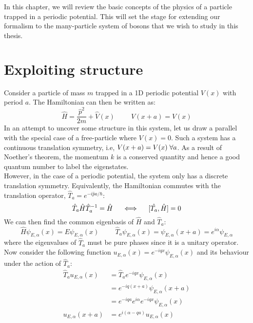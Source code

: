 
In this chapter, we will review the basic concepts of the physics of a particle trapped in a periodic potential. This will set the stage for extending our formalism to the many-particle system of bosons that we wish to study in this thesis. 

\section{Exploiting structure}
Consider a particle of mass $m$ trapped in a 1D periodic potential $V(x)$ with period $a$. The Hamiltonian can then be written as:
\begin{equation}
    \hat{H} = \frac{\hat{p}^2}{2m} + \hat{V}(x)  \hspace{1cm} V(x + a) = V(x)    
\end{equation}
In an attempt to uncover some structure in this system, let us draw a parallel with the special case of a free-particle where $V(x) = 0$. Such a system has a continuous translation symmetry, i.e, $V(x + a) = V(x) \hspace{0.1cm}\forall a$. As a result of Noether's theorem, the momentum $k$ is a conserved quantity and hence a good quantum number to label the eigenstates. 
\vspace{0.5cm}\\
However, in the case of a periodic potential, the system only has a discrete translation symmetry. Equivalently, the Hamiltonian commutes with the translation operator, $\hat{T}_a = e^{-i\hat{p}a/\hbar}$:
\begin{equation}
    \hat{T}_a \hat{H}\hat{T}_a^{-1} = \hat{H} \hspace{0.5cm}\Longleftrightarrow \hspace{0.5cm}[\hat{T_a}, \hat{H}] = 0
\end{equation}
We can then find the common eigenbasis of $\hat{H}$ and $\hat{T}_a$:
\begin{equation}
    \hat{H}\psi_{E, \alpha}(x) = E\psi_{E, \alpha}(x) \hspace{1cm}\hat{T}_a\psi_{E, \alpha}(x) = \psi_{E, \alpha}(x+a) = e^{i\alpha}\psi_{E, \alpha}
\end{equation}
where the eigenvalues of $\hat{T}_a$ must be pure phases since it is a unitary operator. Now consider the following function $u_{E, \alpha}(x) = e^{-iqx}\psi_{E, \alpha}(x)$ and its behaviour under the action of $\hat{T}_a$:
\begin{align*}
    \hat{T}_a u_{E, \alpha}(x) &= \hat{T}_a e^{-iqx} \psi_{E, \alpha}(x)\\    
    &= e^{-iq(x + a)}\psi_{E, \alpha}(x + a)\\
    &= e^{-iqa}e^{i\alpha}e^{-iqx} \psi_{E,\alpha}(x)\\
    u_{E, \alpha}(x + a) &= e^{i(\alpha - qa)} u_{E, \alpha}(x)
\end{align*}
